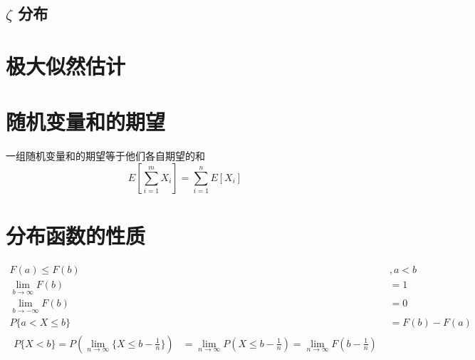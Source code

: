 \documentclass[a4paper]{book}
\begin{document}
    \subsection{$\zeta$ 分布}
    \section{极大似然估计}
    \section{随机变量和的期望}
    一组随机变量和的期望等于他们各自期望的和
    \begin{equation*}
        E[\sum_{i=1}^mX_i] = \sum_{i=1}^nE[X_i]
    \end{equation*}
    \section{分布函数的性质}
    \begin{align}
        F(a) \leq F(b)&,a<b \\
        \lim_{b \to \infty} F(b) &= 1 \\
        \lim_{b \to -\infty} F(b) &= 0 \\
        P\{a<X\leq b\} &= F(b) - F(a) \\
        \begin{split}
            P\{X<b\} = P(\lim_{n \to \infty}\{X \leq b - \frac{1}{n}\}) 
            &= \lim_{n \to \infty}P(X \leq b - \frac{1}{n})
            =\lim_{n \to \infty }F(b - \frac{1}{n}) 
        \end{split}
    \end{align}
    
\end{document}

